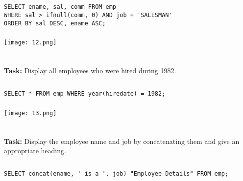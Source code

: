 \documentclass[12pt,a4paper]{article}
\begin{document}
\subsection{}
\begin{lstlisting}
SELECT ename, sal, comm FROM emp 
WHERE sal > ifnull(comm, 0) AND job = 'SALESMAN'
ORDER BY sal DESC, ename ASC;

\end{lstlisting}

\subsubsection{}
\begin{center}
    \texttt{[image: 12.png]}
\end{center}


\section{}
\textbf{Task:} Display all employees who were hired during 1982.

\subsection{}
\begin{lstlisting}
SELECT * FROM emp WHERE year(hiredate) = 1982;

\end{lstlisting}

\subsubsection{}
\begin{center}
    \texttt{[image: 13.png]}
\end{center}


\section{}
\textbf{Task:} Display the employee name and job by concatenating them and
give an appropriate heading.

\subsection{}
\begin{lstlisting}
SELECT concat(ename, ' is a ', job) "Employee Details" FROM emp;

\end{lstlisting}
\end{document}
